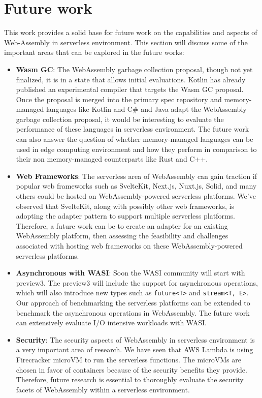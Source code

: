 \chapter{Future work}
\label{chap:future-work}

This work provides a solid base for future work on the capabilities and aspects of Web-Assembly in \gls{serverless} environment. This section will discuss some of the important areas that can be explored in the future works:
\begin{itemize}
    \item \textbf{Wasm GC}: The WebAssembly garbage collection proposal, though not yet finalized, it is in a state that allows initial evaluations. Kotlin has already published an experimental compiler that targets the Wasm GC proposal. Once the proposal is merged into the primary spec repository and memory-managed languages like Kotlin and C\# and Java adapt the WebAssembly garbage collection proposal, it would be interesting to evaluate the performance of these languages in serverless environment. The future work can also answer the question of whether memory-managed languages can be used in edge computing environment and how they perform in comparison to their non memory-managed counterparts like Rust and C++.
    \item \textbf{Web Frameworks}: The serverless area of WebAssembly can gain traction if popular web frameworks such as SvelteKit, Next.js, Nuxt.js, Solid, and many others could be hosted on WebAssembly-powered serverless platforms. We've observed that SvelteKit, along with possibly other web frameworks, is adopting the adapter pattern \cite{sveltecommunity_2023_adapter} to support multiple serverless platforms. Therefore, a future work can be to create an adapter for an existing WebAssembly platform, then assessing the feasibility and challenges associated with hosting web frameworks on these WebAssembly-powered serverless platforms.
    \item \textbf{Asynchronous with WASI}: Soon the WASI community will start with preview3. The preview3 \cite{gohman_2023_wasi} will include the support for asynchronous operations, which will also introduce new types such as \texttt{future<T>} and \texttt{stream<T, E>}. Our approach of benchmarking the serverless platforms can be extended to benchmark the asynchronous operations in WebAssembly. The future work can extensively evaluate I/O intensive workloads with WASI.
    \item \textbf{Security}: The security aspects of WebAssembly in serverless environment is a very important area of research. We have seen that AWS Lambda is using Firecracker microVM to run the serverless functions. The microVMs are chosen in favor of containers because of the security benefits they provide. Therefore, future research is essential to thoroughly evaluate the security facets of WebAssembly within a serverless environment.
\end{itemize}
